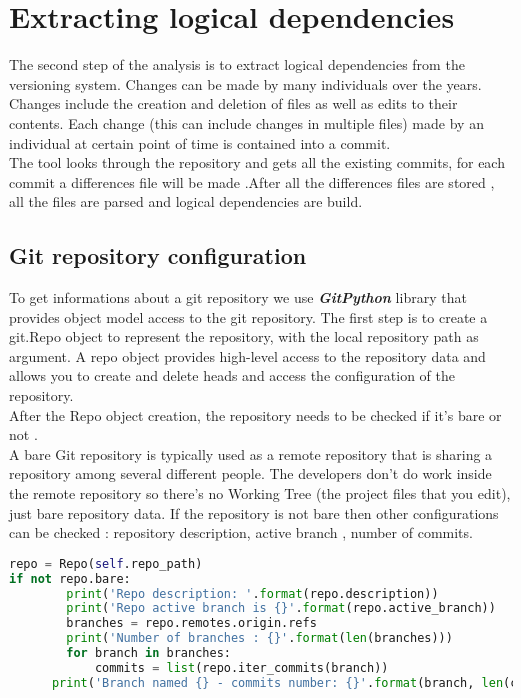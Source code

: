 \section{Extracting logical dependencies}

\tab The second step of the analysis is to extract logical dependencies from the versioning system.  Changes can be made by many individuals over the years.\\ 
Changes include the creation and deletion of ﬁles as well as edits to their contents. Each change (this can include changes in multiple files) made by an individual at certain point of time is contained into a commit\cite{ct7}. \\ The tool looks through the repository and gets all the existing commits, for each commit a diﬀerences ﬁle will be made .After all the differences files are stored , all the files are parsed and logical dependencies are build. 

\subsection{Git repository configuration}
\label{ssec:gitrepo}
\tab To get informations about a git repository we use \textit{\textbf{GitPython}} library that provides object model access to the git repository. The first step is to create a git.Repo object to represent the repository, with the local repository path as argument. A repo object provides high-level access to the repository data and allows you to create and delete heads and access the configuration of the repository.\\
After the Repo object creation, the repository needs to be checked if it's bare or not .\\ A bare Git repository is typically used as a remote repository that is sharing a repository among several different people. The developers don't do work  inside the remote repository so there's no Working Tree (the project files that you edit), just bare repository data. If the repository is not bare then other configurations can be checked : repository description, active branch , number of commits.

\begin{lstlisting}[language=python, caption={Get informations about a git repository.}]
repo = Repo(self.repo_path)
if not repo.bare:
        print('Repo description: '.format(repo.description))
        print('Repo active branch is {}'.format(repo.active_branch))
        branches = repo.remotes.origin.refs
        print('Number of branches : {}'.format(len(branches)))
        for branch in branches:
            commits = list(repo.iter_commits(branch))
	  print('Branch named {} - commits number: {}'.format(branch, len(commits)))
\end{lstlisting}

